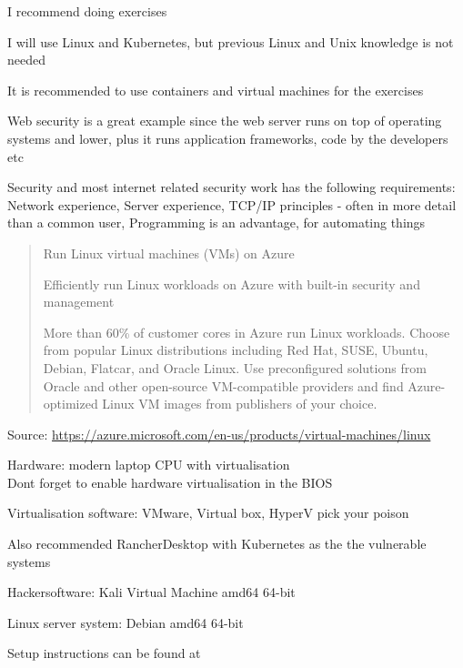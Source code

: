 \documentclass[Screen16to9,17pt]{foils}
\begin{document}
\begin{list2}
\item I recommend doing exercises
\item I will use Linux and Kubernetes, but previous Linux and Unix knowledge is not needed
\item It is recommended to use containers and virtual machines for the exercises
\item Web security is a great example since the web server runs on top of operating systems and lower, plus it runs application frameworks, code by the developers etc

\item Security and most internet related security work has the following requirements:\\
Network experience, Server experience, TCP/IP principles - often in more detail than a common user, Programming is an advantage, for automating things
\end{list2}



\begin{quote}
{\large Run Linux virtual machines (VMs) on Azure}

Efficiently run Linux workloads on Azure with built-in security and management

More than 60\% of customer cores in Azure run Linux workloads. Choose from popular Linux distributions including Red Hat, SUSE, Ubuntu, Debian, Flatcar, and Oracle Linux. Use preconfigured solutions from Oracle and other open-source VM-compatible providers and find Azure-optimized Linux VM images from publishers of your choice.
\end{quote}
Source: \url{https://azure.microsoft.com/en-us/products/virtual-machines/linux}




\begin{list2}
\item Hardware: modern laptop CPU with virtualisation\\
Dont forget to enable hardware virtualisation in the BIOS
\item Virtualisation software: VMware, Virtual box, HyperV pick your poison
\item Also recommended RancherDesktop with Kubernetes as the the vulnerable systems
\item Hackersoftware: Kali Virtual Machine amd64 64-bit 
\item Linux server system: Debian amd64 64-bit 
\item Setup instructions can be found at 
\end{list2}
\end{document}
